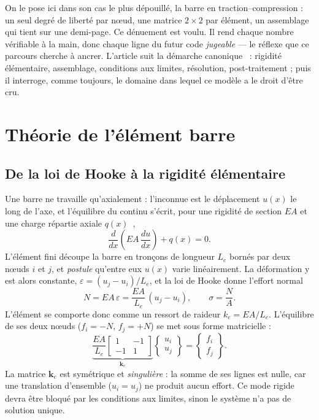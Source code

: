 \documentclass[10pt,journal]{IEEEtran}
\begin{document}
On le pose ici dans son cas le plus dépouillé, la barre en traction--compression : un seul degré de liberté par n\oe{}ud, une matrice $2\times 2$ par élément, un assemblage qui tient sur une demi-page. Ce dénuement est voulu. Il rend chaque nombre vérifiable à la main, donc chaque ligne du futur code \emph{jugeable} --- le réflexe que ce parcours cherche à ancrer. L'article suit la démarche canonique~\cite{logan} : rigidité élémentaire, assemblage, conditions aux limites, résolution, post-traitement ; puis il interroge, comme toujours, le domaine dans lequel ce modèle a le droit d'être cru.

\section{Théorie de l'élément barre}
\subsection{De la loi de Hooke à la rigidité élémentaire}
Une barre ne travaille qu'axialement : l'inconnue est le déplacement $u(x)$ le long de l'axe, et l'équilibre du continu s'écrit, pour une rigidité de section $EA$ et une charge répartie axiale $q(x)$~\cite{gere},
\begin{equation}
\frac{d}{dx}\!\left(EA\,\frac{du}{dx}\right) + q(x) = 0 .
\label{eq:ode}
\end{equation}
L'élément fini découpe la barre en tronçons de longueur $L_e$ bornés par deux n\oe{}uds $i$ et $j$, et \emph{postule} qu'entre eux $u(x)$ varie linéairement. La déformation y est alors constante, $\varepsilon = (u_j-u_i)/L_e$, et la loi de Hooke donne l'effort normal
\begin{equation}
N = EA\,\varepsilon = \frac{EA}{L_e}\,(u_j-u_i), \qquad \sigma = \frac{N}{A}.
\label{eq:hooke}
\end{equation}
L'élément se comporte donc comme un ressort de raideur $k_e = EA/L_e$. L'équilibre de ses deux n\oe{}uds ($f_i = -N$, $f_j = +N$) se met sous forme matricielle :
\begin{equation}
\underbrace{\frac{EA}{L_e}
\begin{bmatrix} 1 & -1 \\ -1 & 1 \end{bmatrix}}_{\mathbf{k}_e}
\begin{Bmatrix} u_i \\ u_j \end{Bmatrix}
=
\begin{Bmatrix} f_i \\ f_j \end{Bmatrix}.
\label{eq:ke}
\end{equation}
La matrice $\mathbf{k}_e$ est symétrique et \emph{singulière} : la somme de ses lignes est nulle, car une translation d'ensemble ($u_i=u_j$) ne produit aucun effort. Ce mode rigide devra être bloqué par les conditions aux limites, sinon le système n'a pas de solution unique.
\end{document}
